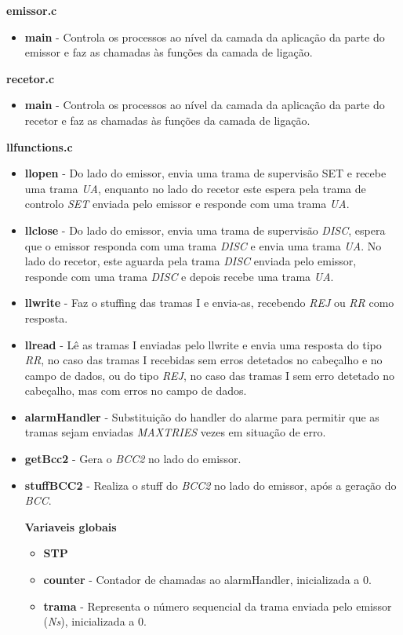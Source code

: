 \documentclass{article}
\begin{document}
\bigskip

\textbf{emissor.c}
\begin{itemize}
	\item \textbf{main} - Controla os processos ao nível da camada da aplicação da parte do emissor e faz as chamadas às funções da camada de ligação.
\end{itemize}


\bigskip

\textbf{recetor.c}
\begin{itemize}
	\item \textbf{main} - Controla os processos ao nível da camada da aplicação da parte do recetor e faz as chamadas às funções da camada de ligação.
\end{itemize}

\bigskip

\textbf{llfunctions.c}
\begin{itemize}
	\item \textbf{llopen} - Do lado do emissor, envia uma trama de supervisão SET e recebe uma trama \textit{UA}, enquanto no lado do recetor este espera pela trama de controlo \textit{SET} enviada pelo emissor e responde com uma trama \textit{UA}.
	\item \textbf{llclose} -  Do lado do emissor, envia uma trama de supervisão \textit{DISC}, espera que o emissor responda com uma trama \textit{DISC} e envia uma trama \textit{UA}. No lado do recetor, este aguarda pela trama \textit{DISC} enviada pelo emissor, responde com uma trama \textit{DISC} e depois recebe uma trama \textit{UA}.
	\item \textbf{llwrite} - Faz o stuffing das tramas I e envia-as, recebendo \textit{REJ} ou \textit{RR} como resposta.
	\item \textbf{llread} - Lê as tramas I enviadas pelo llwrite e envia uma resposta do tipo \textit{RR}, no caso das tramas I recebidas sem erros detetados no cabeçalho e no campo de dados, ou do tipo \textit{REJ}, no caso das tramas I sem erro detetado no cabeçalho, mas com erros no campo de dados.
	\item \textbf{alarmHandler} - Substituição do handler do alarme para permitir que as tramas sejam enviadas \textit{MAXTRIES} vezes em situação de erro.
	\item \textbf{getBcc2} - Gera o \textit{BCC2} no lado do emissor.
	\item \textbf{stuffBCC2} - Realiza o stuff do \textit{BCC2} no lado do emissor, após a geração do \textit{BCC}.
	
	\textbf{Variaveis globais}
	\begin{itemize}
		\item \textbf{STP}
		\item \textbf{counter} - Contador de chamadas ao alarmHandler, inicializada a 0.
		\item \textbf{trama} - Representa o número sequencial da trama enviada pelo emissor (\textit{Ns}), inicializada a 0.
	\end{itemize}
\end{itemize}
\end{document}
